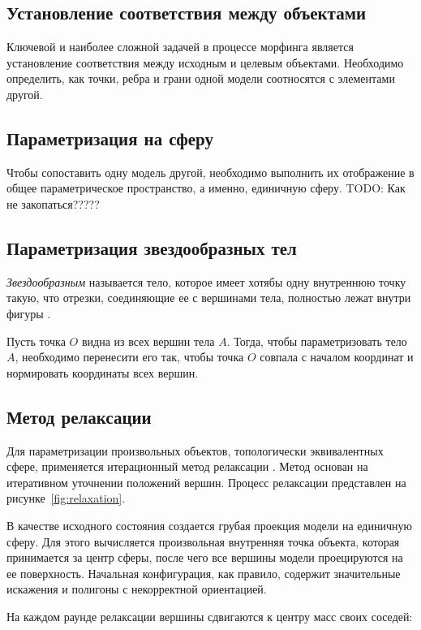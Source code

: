     \subsection{Установление соответствия между объектами}

    Ключевой и наиболее сложной задачей в процессе морфинга является установление соответствия между исходным и целевым объектами. Необходимо определить, как точки, ребра и грани одной модели соотносятся с элементами другой.
    
    \subsection{Параметризация на сферу}
    Чтобы сопоставить одну модель другой, необходимо выполнить их отображение в общее параметрическое пространство, а именно, единичную сферу. TODO: Как не закопаться?????
    
	\subsection{Параметризация звездообразных тел}
	\textit{Звездообразным} называется тело, которое имеет хотябы одну внутреннюю точку такую, что отрезки, соединяющие ее с вершинами тела, полностью лежат внутри фигуры \cite{alexa}.
	   
   Пусть точка $O$ видна из всех вершин тела $A$. Тогда, чтобы параметризовать тело $A$, необходимо перенесити его так, чтобы точка $O$ совпала с началом координат и нормировать координаты всех вершин.

	\subsection{Метод релаксации}
	Для параметризации произвольных объектов, топологически эквивалентных сфере, применяется итерационный метод релаксации \cite{alexa}. Метод основан на итеративном уточнении положений вершин.
	Процесс релаксации представлен на рисунке~\ref{fig:relaxation}. 
	
	В качестве исходного состояния создается грубая проекция модели на единичную сферу. Для этого вычисляется произвольная внутренняя точка объекта, которая принимается за центр сферы, после чего все вершины модели проецируются на ее поверхность. Начальная конфигурация, как правило, содержит значительные искажения и полигоны с некорректной ориентацией.
	
	На каждом раунде релаксации вершины сдвигаются к центру масс своих соседей:
	
